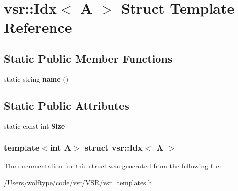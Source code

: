 \hypertarget{structvsr_1_1_idx}{\section{vsr\-:\-:Idx$<$ A $>$ Struct Template Reference}
\label{structvsr_1_1_idx}
}
\subsection*{Static Public Member Functions}
\begin{DoxyCompactItemize}
\item 
\hypertarget{structvsr_1_1_idx_ada785cb17534d5462591c88bdfaa171a}{static string {\bfseries name} ()}\label{structvsr_1_1_idx_ada785cb17534d5462591c88bdfaa171a}

\end{DoxyCompactItemize}
\subsection*{Static Public Attributes}
\begin{DoxyCompactItemize}
\item 
\hypertarget{structvsr_1_1_idx_a73e644c9135de8a7f3a91109c2431a2e}{static const int {\bfseries Size}}\label{structvsr_1_1_idx_a73e644c9135de8a7f3a91109c2431a2e}

\end{DoxyCompactItemize}
\subsubsection*{template$<$int A$>$ struct vsr\-::\-Idx$<$ A $>$}



The documentation for this struct was generated from the following file\-:\begin{DoxyCompactItemize}
\item 
/\-Users/wolftype/code/vsr/\-V\-S\-R/vsr\-\_\-templates.\-h\end{DoxyCompactItemize}
